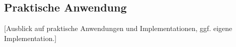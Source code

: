 \subsection{Praktische Anwendung}
[Ausblick auf praktische Anwendungen und Implementationen, ggf. eigene Implementation.]
